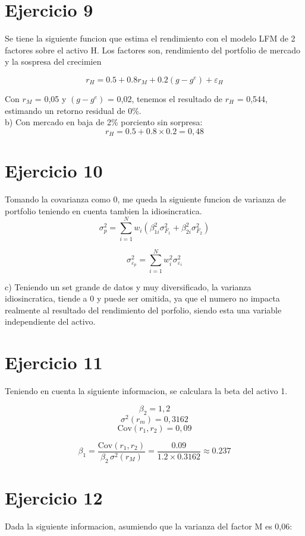 \documentclass{article}
\begin{document}
\section{Ejercicio 9}
Se tiene la siguiente funcion que estima el rendimiento con el modelo LFM de 2 factores sobre el activo H.
Los factores son, rendimiento del portfolio de mercado y la sospresa del crecimien

\[
r_H = 0.5 + 0.8 r_M + 0.2 (g - g^e) + \varepsilon_H
\]

Con $r_M$ = 0,05 y $(g - g^e)$ = 0,02, tenemos el resultado de $r_H$ = 0,544, estimando un retorno residual de 0\%.
\\

b) Con mercado en baja de 2\% porciento sin sorpresa:
\[
r_H = 0.5 + 0.8 \times 0.2 = 0,48
\]


\section{Ejercicio 10}
Tomando la covarianza como 0, me queda la siguiente funcion de varianza de portfolio teniendo en cuenta tambien la idiosincratica.
\[
\sigma^2_p = \sum_{i=1}^{N} w_i ( \beta_{1i}^2 \sigma_{F_1}^2 + \beta_{2i}^2 \sigma_{F_2}^2 )   
\]


\[
\sigma^2_{\varepsilon_p} = \sum_{i=1}^{N} w_i^2 \sigma^2_{\varepsilon_i}
\]

c) Teniendo un set grande de datos y muy diversificado, la varianza idiosincratica, tiende a 0 y puede ser omitida, ya que el numero no impacta realmente al resultado del
rendimiento del porfolio, siendo esta una variable independiente del activo. 

\section{Ejercicio 11}
Teniendo en cuenta la siguiente informacion, se calculara la beta del activo 1.

\[
\beta_2 = 1,2
\]
\[
\sigma^2(r_m)= 0,3162
\]
\[
\mathrm{Cov}(r_{1}, r_{2}) = 0,09
\]


\[
\beta_1 = \frac{\mathrm{Cov}(r_1, r_2)}{\beta_2 \, \sigma^2(r_M)} = \frac{0.09}{1.2 \times 0.3162} \approx 0.237
\]

\section{Ejercicio 12}
Dada la siguiente informacion, asumiendo que la varianza del factor M es 0,06:
\end{document}
